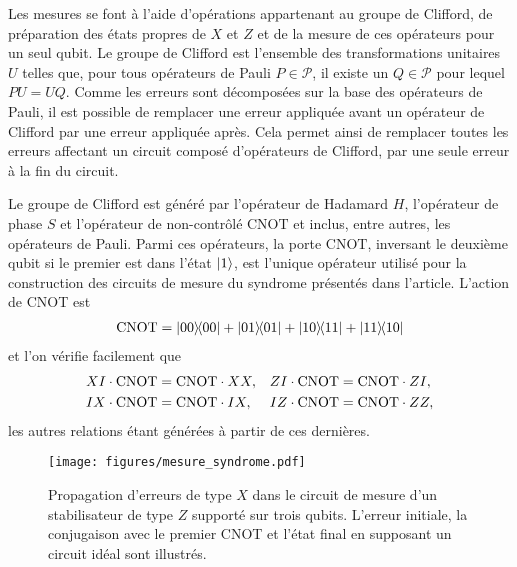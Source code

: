 Les mesures se font à l'aide d'opérations appartenant au groupe de Clifford,
de préparation des états propres de $X$ et $Z$ et de la mesure de ces opérateurs
pour un seul qubit.
Le groupe de Clifford est l'ensemble des transformations unitaires $U$ telles que,
pour tous opérateurs de Pauli $P \in \mathcal P$,
il existe un $Q \in \mathcal P$ pour lequel $PU = UQ$.
Comme les erreurs sont décomposées sur la base des opérateurs de Pauli,
il est possible de remplacer une erreur appliquée avant un opérateur de Clifford
par une erreur appliquée après.
Cela permet ainsi de remplacer toutes les erreurs affectant un circuit composé d'opérateurs de Clifford,
par une seule erreur à la fin du circuit.

Le groupe de Clifford est généré par l'opérateur de Hadamard $H$,
l'opérateur de phase $S$ et l'opérateur de non-contrôlé $\text{CNOT}$
et inclus, entre autres, les opérateurs de Pauli.
Parmi ces opérateurs,
la porte $\text{CNOT}$,
inversant le deuxième qubit si le premier est dans l'état $\ket{1}$,
est l'unique opérateur utilisé pour la construction des circuits de mesure du syndrome 
présentés dans l'article.
L'action de CNOT est 
\begin{align}
	\text{CNOT} = \op{00}{00} + \op{01}{01} + \op{10}{11} + \op{11}{10}
\end{align}
et l'on vérifie facilement que
\begin{align}
	&XI \cdot \text{CNOT} = \text{CNOT} \cdot XX,
	&&ZI \cdot \text{CNOT} = \text{CNOT} \cdot ZI, \notag \\
	&IX \cdot \text{CNOT} = \text{CNOT} \cdot IX,
	&&IZ \cdot \text{CNOT} = \text{CNOT} \cdot ZZ,
	\label{eq:cnot_pauli}
\end{align}
les autres relations étant générées à partir de ces dernières.

\begin{figure}
	\centering
	\texttt{[image: figures/mesure\_syndrome.pdf]}
	\caption[Exemple de mesure de syndrome]{
		Propagation d'erreurs de type $X$ dans le circuit de mesure d'un
		stabilisateur de type $Z$ supporté sur trois qubits.
		L'erreur initiale, la conjugaison avec le premier CNOT 
		et l'état final en supposant un circuit idéal sont illustrés.
	}
	\label{fig:mesure_syndrome}
\end{figure}

